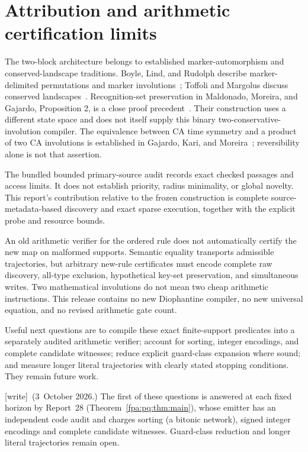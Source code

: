 \documentclass[11pt,a4paper]{article}
\numberwithin{equation}{section}
\newcommand{\wtag}{\textup{[write]}}
\begin{document}
\section{Attribution and arithmetic certification limits}
The two-block architecture belongs to established marker-automorphism and conserved-landscape traditions. Boyle, Lind, and Rudolph describe marker-delimited permutations and marker involutions~\cite{fpa:blr}; Toffoli and Margolus discuss conserved landscapes~\cite{fpa:tm}. Recognition-set preservation in Maldonado, Moreira, and Gajardo, Proposition 2, is a close proof precedent~\cite{fpa:mmg}. Their construction uses a different state space and does not itself supply this binary two-conservative-involution compiler. The equivalence between CA time symmetry and a product of two CA involutions is established in Gajardo, Kari, and Moreira~\cite{fpa:gkm}; reversibility alone is not that assertion.

The bundled bounded primary-source audit records exact checked passages and access limits. It does not establish priority, radius minimality, or global novelty. This report's contribution relative to the frozen construction is complete source-metadata-based discovery and exact sparse execution, together with the explicit probe and resource bounds.

An old arithmetic verifier for the ordered rule does not automatically certify the new map on malformed supports. Semantic equality transports admissible trajectories, but arbitrary new-rule certificates must encode complete raw discovery, all-type exclusion, hypothetical key-set preservation, and simultaneous writes. Two mathematical involutions do not mean two cheap arithmetic instructions. This release contains no new Diophantine compiler, no new universal equation, and no revised arithmetic gate count.

Useful next questions are to compile these exact finite-support predicates into a separately audited arithmetic verifier; account for sorting, integer encodings, and complete candidate witnesses; reduce explicit guard-class expansion where sound; and measure longer literal trajectories with clearly stated stopping conditions. They remain future work.

\wtag\ (3~October 2026.) The first of these questions is answered at each fixed horizon by Report~28 (Theorem~\ref{fpa:pq:thm:main}), whose emitter has an independent code audit and charges sorting (a bitonic network), signed integer encodings and complete candidate witnesses. Guard-class reduction and longer literal trajectories remain open.
\end{document}
